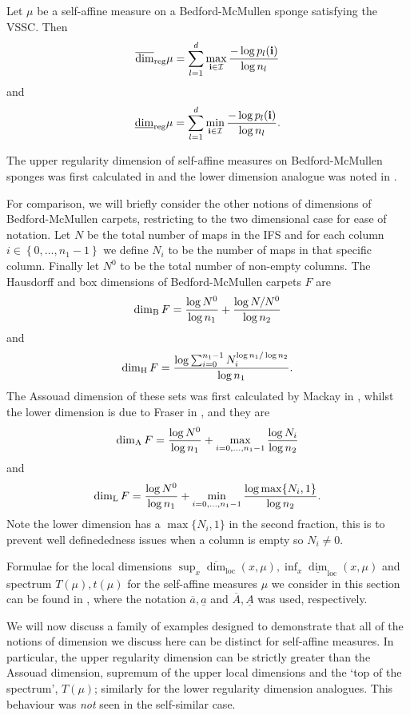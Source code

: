 \begin{theorem}\label{ch-upper-reg:carpet}
	Let $\mu$ be a self-affine measure on a Bedford-McMullen sponge satisfying the VSSC.  Then
	\[
	\overline{\dim}_{\textup{reg}} \mu =\sum_{l=1}^d \max_{\mathbf{i}\in \mathcal{I}}\frac{-\log p_l(\mathbf{i})}{\log n_l}
	\]
	and 
	\[
	\underline{\dim}_{\textup{reg}} \mu =\sum_{l=1}^d \min_{\mathbf{i}\in \mathcal{I}}\frac{-\log p_l(\mathbf{i})}{\log n_l}.
	\]
\end{theorem}

The upper regularity dimension of self-affine measures on Bedford-McMullen sponges was first calculated in \cite{fraser-howroyd2} and the lower dimension analogue was noted in \cite{hare-troscheit}.

For comparison, we will briefly consider the other notions of dimensions of Bedford-McMullen carpets, restricting to the two dimensional case for ease of notation. Let $N$ be the total number of maps in the IFS and for each column $i\in \left\{0,\ldots, n_1 - 1\right\}$ we define $N_i$ to be the number of maps in that specific column. Finally let $N^0$ to be the total number of non-empty columns. The Hausdorff and box dimensions of Bedford-McMullen carpets $F$ are 
\[
\dim_{\textup{B}} F = \frac{\log N^0}{\log n_1} + \frac{\log N/N^0}{\log n_2}
\]
and 
\[
\dim_{\textup{H}} F = \frac{\log \sum_{i=0}^{n_1 - 1} N_i^{\log n_1 / \log n_2} }{\log n_1}.
\]
The Assouad dimension of these sets was first calculated by Mackay in \cite{mackay}, whilst the lower dimension is due to Fraser in \cite{Fr}, and they are
\[
\dim_{\textup{A}} F = \frac{\log N^0}{\log n_1} + \max_{i = 0, \ldots, n_1-1} \frac{\log N_i}{\log n_2}
\]
and 
\[
\dim_{\textup{L}} F = \frac{\log N^0}{\log n_1} + \min_{i = 0, \ldots, n_1-1} \frac{\log \max\{N_i, 1 \}}{\log n_2}.
\]
Note the lower dimension has a $\max\{N_i, 1\}$ in the second fraction, this is to prevent well definededness issues when a column is empty so $N_i \neq 0$.


Formulae for the local dimensions $\sup_x \overline{\dim}_{\text{loc}}(x,\mu), \inf_x \underline{\dim}_{\text{loc}}(x,\mu)$ and spectrum $T(\mu), t(\mu)$ for the self-affine measures $\mu$ we consider in this section can be found in \cite{sponges}, where the notation $\overline{a}, \underline{a}$ and $\overline{A}, \underline{A}$ was used, respectively.


We will now discuss a family of examples designed to demonstrate that all of the notions of dimension we discuss here can be distinct for self-affine measures.  In particular, the upper regularity dimension can be strictly greater than the Assouad dimension, supremum of the upper local dimensions and the `top of the spectrum', $T(\mu)$; similarly for the lower regularity dimension analogues.  This behaviour was \emph{not} seen in the self-similar case.

